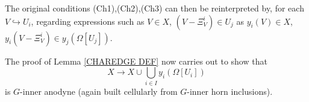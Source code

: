 \documentclass[a4paper,10pt,draft]{article}%
\begin{document}
\begin{remark}
The original conditions (Ch1),(Ch2),(Ch3) can then be reinterpreted by, 
for each $V \hookrightarrow U_i$, 
regarding expressions such as $V \in X$, $(V-\Xi^i_V)\in U_j$
as $y_i(V) \in X$, $y_i(V-\Xi^i_V) \in y_j(\Omega[U_j])$.

The proof of Lemma \ref{CHAREDGE DEF} now carries out to show that 
\begin{equation}
	X \to X \cup \bigcup_{i \in I} y_i(\Omega[U_i])
\end{equation}
is $G$-inner anodyne (again built cellularly from $G$-inner horn inclusions).
\end{remark}


\end{document}
